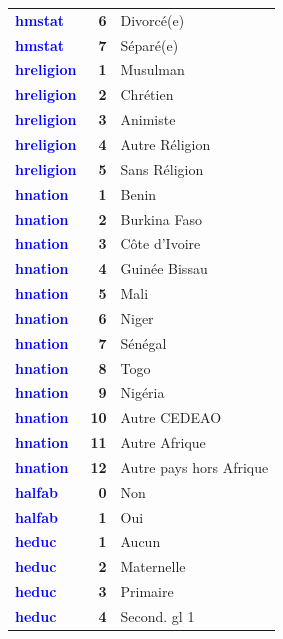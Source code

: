 \documentclass[
]{article}
\begin{document}
\begin{longtable}[t]{>{}l>{}r>{\raggedright\arraybackslash}p{8cm}}
\textcolor{blue}{\textbf{hmstat}} & \textbf{6} & Divorcé(e)\\
\textcolor{blue}{\textbf{hmstat}} & \textbf{7} & Séparé(e)\\
\addlinespace
\textcolor{blue}{\textbf{hreligion}} & \textbf{1} & Musulman\\
\textcolor{blue}{\textbf{hreligion}} & \textbf{2} & Chrétien\\
\textcolor{blue}{\textbf{hreligion}} & \textbf{3} & Animiste\\
\textcolor{blue}{\textbf{hreligion}} & \textbf{4} & Autre Réligion\\
\textcolor{blue}{\textbf{hreligion}} & \textbf{5} & Sans Réligion\\
\addlinespace
\textcolor{blue}{\textbf{hnation}} & \textbf{1} & Benin\\
\textcolor{blue}{\textbf{hnation}} & \textbf{2} & Burkina Faso\\
\textcolor{blue}{\textbf{hnation}} & \textbf{3} & Côte d'Ivoire\\
\textcolor{blue}{\textbf{hnation}} & \textbf{4} & Guinée Bissau\\
\textcolor{blue}{\textbf{hnation}} & \textbf{5} & Mali\\
\addlinespace
\textcolor{blue}{\textbf{hnation}} & \textbf{6} & Niger\\
\textcolor{blue}{\textbf{hnation}} & \textbf{7} & Sénégal\\
\textcolor{blue}{\textbf{hnation}} & \textbf{8} & Togo\\
\textcolor{blue}{\textbf{hnation}} & \textbf{9} & Nigéria\\
\textcolor{blue}{\textbf{hnation}} & \textbf{10} & Autre CEDEAO\\
\addlinespace
\textcolor{blue}{\textbf{hnation}} & \textbf{11} & Autre Afrique\\
\textcolor{blue}{\textbf{hnation}} & \textbf{12} & Autre pays hors Afrique\\
\textcolor{blue}{\textbf{halfab}} & \textbf{0} & Non\\
\textcolor{blue}{\textbf{halfab}} & \textbf{1} & Oui\\
\textcolor{blue}{\textbf{heduc}} & \textbf{1} & Aucun\\
\addlinespace
\textcolor{blue}{\textbf{heduc}} & \textbf{2} & Maternelle\\
\textcolor{blue}{\textbf{heduc}} & \textbf{3} & Primaire\\
\textcolor{blue}{\textbf{heduc}} & \textbf{4} & Second. gl 1\\

\end{longtable}
\end{document}
